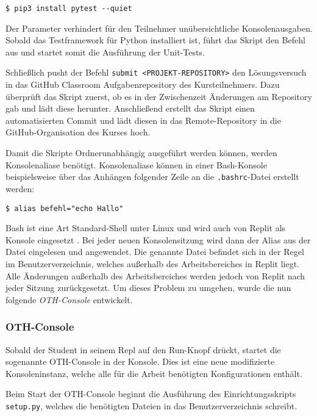 \begin{lstlisting}[style=Bash]
    $ pip3 install pytest --quiet
\end{lstlisting}

Der Parameter  verhindert für den Teilnehmer unübersichtliche
Konsolenausgaben. Sobald das Testframework für Python installiert ist, führt das
Skript den Befehl  aus und startet somit die Ausführung der
Unit-Tests.

Schließlich pusht der Befehl \texttt{submit <PROJEKT-REPOSITORY>}
den Lösungsversuch in das GitHub Classroom Aufgabenrepository des
Kursteilnehmers. Dazu überprüft das Skript zuerst, ob es in der Zwischenzeit
Änderungen am Repository gab und lädt diese herunter. Anschließend erstellt
das Skript einen automatisierten Commit und lädt diesen in das Remote-Repository
in die GitHub-Organisation des Kurses hoch.

Damit die Skripte Ordnerunabhängig ausgeführt werden können, werden
Konsolenaliase benötigt. Konsolenaliase können in einer Bash-Konsole
beispielsweise über das Anhängen folgender Zeile an die \texttt{.bashrc}-Datei
erstellt werden:

\begin{lstlisting}[style=Bash]
    $ alias befehl="echo Hallo"
\end{lstlisting}

Bash ist eine Art \glqq Standard-Shell\grqq{} unter Linux und wird auch von
Replit als Konsole eingesetzt \parencite{bash}. Bei jeder neuen Konsolensitzung
wird dann der Alias aus der Datei eingelesen und angewendet. Die genannte Datei
befindet sich in der Regel im Benutzerverzeichnis, welches außerhalb des
Arbeitsbereiches in Replit liegt. Alle Änderungen außerhalb des Arbeitsbereiches
werden jedoch von Replit nach jeder Sitzung zurückgesetzt. Um dieses Problem zu
umgehen, wurde die nun folgende \emph{OTH-Console} entwickelt.

\subsubsection{OTH-Console}\label{replit-template-oth-console}
Sobald der Student in seinem Repl auf den Run-Knopf drückt, startet die
sogenannte OTH-Console in der Konsole. Dies ist eine neue
modifizierte Konsoleninstanz, welche alle für die Arbeit benötigten
Konfigurationen enthält.

Beim Start der OTH-Console beginnt die Ausführung des Einrichtungsskripts
\texttt{setup.py}, welches die benötigten Dateien in das Benutzerverzeichnis
schreibt.

